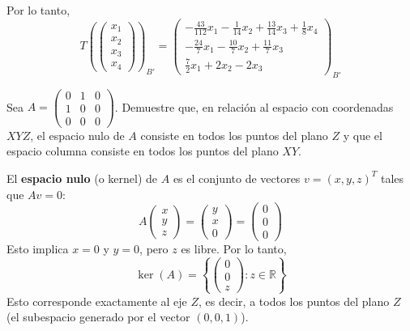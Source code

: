 \begin{prob}
\begin{myproof}
Por lo tanto,
\[
T\left(\begin{pmatrix} x_1 \\ x_2 \\ x_3 \\ x_4 \end{pmatrix}\right)_{B'} =
\begin{pmatrix}
-\frac{43}{112}x_1 - \frac{1}{14}x_2 + \frac{13}{14}x_3 + \frac{1}{8}x_4 \\
-\frac{24}{7}x_1 - \frac{10}{7}x_2 + \frac{11}{7}x_3 \\
\frac{7}{2}x_1 + 2x_2 - 2x_3
\end{pmatrix}_{B'}
\]
\end{myproof}
\end{prob}

 
\begin{prob}
Sea $A = \begin{pmatrix}
0 & 1 & 0 \\
1 & 0 & 0 \\
0 & 0 & 0
\end{pmatrix}$. Demuestre que, en relación al espacio con coordenadas $XYZ$, el espacio nulo de $A$ consiste en todos los puntos del plano $Z$ y que el espacio columna consiste en todos los puntos del plano $XY$.
\begin{myproof}
El \textbf{espacio nulo} (o kernel) de $A$ es el conjunto de vectores $v = (x, y, z)^T$ tales que $A v = 0$:
\[
A \begin{pmatrix} x \\ y \\ z \end{pmatrix} = \begin{pmatrix} y \\ x \\ 0 \end{pmatrix} = \begin{pmatrix} 0 \\ 0 \\ 0 \end{pmatrix}
\]
Esto implica $x = 0$ y $y = 0$, pero $z$ es libre. Por lo tanto,
\[
\ker(A) = \left\{ \begin{pmatrix} 0 \\ 0 \\ z \end{pmatrix} : z \in \mathbb{R} \right\}
\]
Esto corresponde exactamente al eje $Z$, es decir, a todos los puntos del plano $Z$ (el subespacio generado por el vector $(0,0,1)$).


\end{myproof}
\end{prob}
